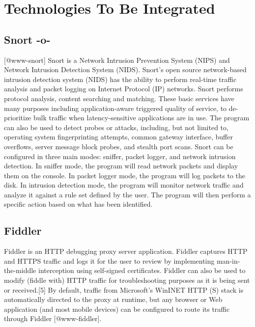 \section{Technologies To Be Integrated}

\subsection{Snort -o-}

 [@www-snort] Snort is a Network Intrusion Prevention System
(NIPS) and Network Intrusion Detection System (NIDS). Snort's open
source network-based intrusion detection system (NIDS) has the ability
to perform real-time traffic analysis and packet logging on Internet
Protocol (IP) networks. Snort performs protocol analysis, content
searching and matching. These basic services have many purposes
including application-aware triggered quality of service, to
de-prioritize bulk traffic when latency-sensitive applications are in
use.  The program can also be used to detect probes or attacks,
including, but not limited to, operating system fingerprinting
attempts, common gateway interface, buffer overflows, server message
block probes, and stealth port scans.  Snort can be configured in
three main modes: sniffer, packet logger, and network intrusion
detection. In sniffer mode, the program will read network packets and
display them on the console. In packet logger mode, the program will
log packets to the disk. In intrusion detection mode, the program will
monitor network traffic and analyze it against a rule set defined by
the user. The program will then perform a specific action based on
what has been identified.

\subsection{Fiddler}

Fiddler is an HTTP debugging proxy server application. Fiddler
captures HTTP and HTTPS traffic and logs it for the user to review by
implementing man-in-the-middle interception using self-signed
certificates. Fiddler can also be used to modify (fiddle with) HTTP
traffic for troubleshooting purposes as it is being sent or
received.[5] By default, traffic from Microsoft's WinINET HTTP (S)
stack is automatically directed to the proxy at runtime, but any
browser or Web application (and most mobile devices) can be configured
to route its traffic through Fiddler [@www-fiddler].

